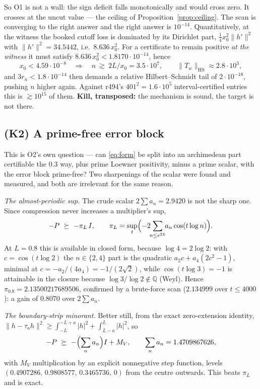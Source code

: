 \documentclass[11pt]{article}
\theoremstyle{remark}
\begin{document}
So O1 is not a wall: the sign deficit falls monotonically and would
cross zero.  It crosses at the uncut value --- the ceiling of
Proposition~\ref{prop:ceiling}.  The scan is converging to the right
answer and the right answer is $10^{-14}$.
Quantitatively, at the witness the booked cutoff loss is dominated by
its Dirichlet part, $\tfrac14x_0^2\|h'\|^2$ with
$\|h'\|^2=34.5442$, i.e.\ $8.636\,x_0^2$.  For a certificate to
remain positive \emph{at the witness} it must satisfy
$8.636\,x_0^2<1.8170\cdot10^{-14}$, hence
\[
 x_0<4.59\cdot10^{-8}
 \quad\Longrightarrow\quad
 n\ \gtrsim\ 2L/x_0=3.5\cdot10^{7},
 \qquad \|T_w\|_{\mathrm{HS}}\approx2.8\cdot10^{3},
\]
and $3r_n<1.8\cdot10^{-14}$ then demands a relative Hilbert--Schmidt
tail of $2\cdot10^{-18}$, pushing $n$ higher again.  Against r494's
$401^2=1.6\cdot10^5$ interval-certified entries this is
$\gtrsim10^{15}$ of them.  \textbf{Kill, transposed:} the mechanism
is sound, the target is not there.

\subsection{(K2) A prime-free error block}\label{sec:k2}

This is O2's own question --- can \eqref{eq:form} be split into an
archimedean part certifiable the $0.3$ way, plus prime Loewner
positivity, minus a prime scalar, with the error block prime-free?
Two sharpenings of the scalar were found and measured, and both are
irrelevant for the same reason.

\emph{The almost-periodic sup.}  The crude scalar $2\sum a_n=2.9420$
is not the sharp one.  Since compression never increases a
multiplier's sup,
\[
 -P\ \succeq\ -\pi_L\,I,\qquad
 \pi_L=\sup_{t}\Bigl(-2\!\!\sum_{n\le e^{2L}}\!\!a_n\cos(t\log n)\Bigr).
\]
At $L=0.8$ this is available in closed form, because $\log4=2\log2$:
with $c=\cos(t\log2)$ the $n\in\{2,4\}$ part is the quadratic
$a_2c+a_4(2c^2-1)$, minimal at $c=-a_2/(4a_4)=-1/(2\sqrt2)$, while
$\cos(t\log3)=-1$ is attainable in the closure because
$\log3/\log2\notin\mathbb Q$ (Weyl).  Hence
$\pi_{0.8}=2.13500217689506$, confirmed by a brute-force scan
($2.134999$ over $t\le4000$): a gain of $0.8070$ over $2\sum a_n$.

\emph{The boundary-strip minorant.}  Better still, from the exact
zero-extension identity,
$\|h-\tau_ah\|^2\ge\int_{-L}^{-L+a}|h|^2+\int_{L-a}^{L}|h|^2$, so
\[
 -P\ \succeq\ -\Bigl(\sum_n a_n\Bigr)I+M_V,\qquad
 \sum_n a_n=1.4709867626,
\]
with $M_V$ multiplication by an explicit nonnegative step function,
levels $(0.4907286,\,0.9808577,\,0.3465736,\,0)$ from the centre
outwards.  This beats $\pi_L$ and is exact.
\end{document}
